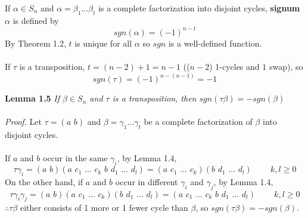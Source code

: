\documentclass{article}
\begin{document}
If \(\alpha\in S_n\) and \(\alpha=\beta_1 ...\beta_t\) is a complete factorization into disjoint cycles, \textbf{signum} \(\alpha\) is defined by
\[sgn(\alpha)=(-1)^{n-t}\]
By \color{gray}Theorem 1.2\color{black}, \(t\) is unique for all \(\alpha\) so \(sgn\) is a well-defined function.\\\\
If \(\tau\) is a transposition, \(t=(n-2)+1=n-1\) ((\(n-2\)) 1-cycles and \(1\) swap), so
\[sgn(\tau)=(-1)^{n-(n-1)}=-1\]
\begin{greenrules}\color{OliveGreen}
\textbf{Lemma 1.5} \textit{If \(\beta\in S_n\) and \(\tau\) is a transposition, then \(sgn(\tau\beta)=-sgn(\beta)\)}\\\\\color{black}
\textit{Proof.} Let \(\tau=(a\,\,b)\) and \(\beta=\gamma_1...\gamma_t\) be a complete factorization of \(\beta\) into disjoint cycles.\\\\
If \(a\) and \(b\) occur in the same \(\gamma_i\), by \color{gray}Lemma 1.4\color{black},
\[\tau\gamma_i=(a\,\,b)(a\,\,c_1\,\,...\,\,c_k\,\,b\,\,d_1\,\,...\,\,d_l)=(a\,\,c_1\,\,...\,\,c_k)(b\,\,d_1\,\,...\,\,d_l)\;\;\;\;\;\;\;\;k,l\ge 0\]
On the other hand, if \(a\) and \(b\) occur in different \(\gamma_i\) and \(\gamma_j\), by \color{gray}Lemma 1.4\color{black},
\[\tau\gamma_i\gamma_j=(a\,\,b)(a\,\,c_1\,\,...\,\,c_k)(b\,\,d_1\,\,...\,\,d_l)=(a\,\,c_1\,\,...\,\,c_k\,\,b\,\,d_1\,\,...\,\,d_l)\;\;\;\;\;\;\;\;k,l\ge 0\]
\(\therefore\tau\beta\) either consists of 1 more or 1 fewer cycle than \(\beta\), so \(sgn(\tau\beta)=-sgn(\beta)\).
\end{greenrules}
\end{document}
